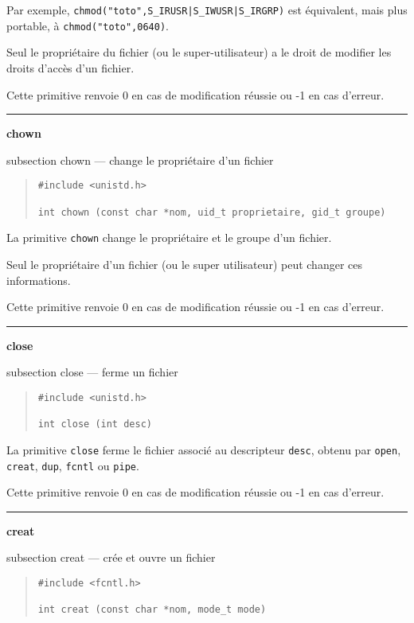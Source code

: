 \documentclass [twoside] {report}
\newcommand {\primitive} [1]
    {
	{\large \bf #1}
	\addcontentsline {toc} {subsection} {#1}
    }
\newcommand {\separation}
    {
	\vspace {7mm}
	\nopagebreak
	\hrule
    }
\begin{document}
Par exemple, \verb/chmod("toto",S_IRUSR|S_IWUSR|S_IRGRP)/ est
équivalent, mais plus portable, à \verb/chmod("toto",0640)/.

Seul le propriétaire du fichier (ou le
super-utilisateur) a le droit de modifier les
droits d'accès d'un fichier.

Cette primitive renvoie 0 en cas de modification
réussie ou -1 en cas d'erreur.




\separation
\primitive {chown} --- change le propriétaire d'un fichier

\begin {quote}
\begin {verbatim}
#include <unistd.h>

int chown (const char *nom, uid_t proprietaire, gid_t groupe)
\end{verbatim}
\end {quote}

La primitive {\tt chown} change le propriétaire et
le groupe d'un fichier.

Seul le propriétaire d'un fichier (ou le super
utilisateur) peut changer ces informations.

Cette primitive renvoie 0 en cas de modification
réussie ou -1 en cas d'erreur.




\separation
\primitive {close} --- ferme un fichier

\begin {quote}
\begin {verbatim}
#include <unistd.h>

int close (int desc)
\end{verbatim}
\end {quote}

La primitive {\tt close} ferme le fichier associé
au descripteur {\tt desc}, obtenu par {\tt open},
{\tt creat}, {\tt dup}, {\tt fcntl} ou {\tt pipe}.

Cette primitive renvoie 0 en cas de modification
réussie ou -1 en cas d'erreur.




\separation
\primitive {creat} --- crée et ouvre un fichier

\begin {quote}
\begin {verbatim}
#include <fcntl.h>

int creat (const char *nom, mode_t mode)
\end{verbatim}
\end {quote}
\end{document}

